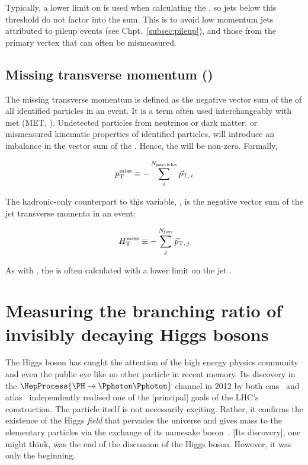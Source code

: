 Typically, a lower limit on \pt is used when calculating the \HT, so jets below this threshold do not factor into the sum. This is to avoid low momentum jets attributed to pileup events (see Chpt.~\ref{subsec:pileup}), and those from the primary vertex that can often be mismeasured.




\subsection{Missing transverse momentum (\texorpdfstring{\ptmiss}{ptmiss})}
\label{subsec:theory_met}

The missing transverse momentum \ptmiss is defined as the negative vector sum of the \pt of all identified particles in an event. It is a term often used interchangeably with \gls{met} (MET, ). Undetected particles from neutrinos or dark matter, or mismeasured kinematic properties of identified particles, will introduce an imbalance in the vector sum of the \pt. Hence, the \ptmiss will be non-zero. Formally,

\begin{equation}
    p_{\mathrm{T}}^\text{miss} \equiv - \sum_i^{N_{\mathrm{particles}}} \vec{p}_{\mathrm{T}, \, i}
    \label{eq:met_definition}
\end{equation}

The hadronic-only counterpart to this variable, \mht, is the negative vector sum of the jet transverse momenta in an event:

\begin{equation}
    H_{\mathrm{T}}^{\text{miss}} \equiv - \sum_j^{N_{\mathrm{jets}}} \vec{p}_{\mathrm{T}, \, j}
    \label{eq:mht_definition}
\end{equation}

As with \HT, the \mht is often calculated with a lower limit on the jet \pt.





\section{Measuring the branching ratio of invisibly decaying Higgs bosons}
\label{sec:theory_higgs_to_inv}

The Higgs boson has caught the attention of the high energy physics community and even the public eye like no other particle in recent memory. Its discovery in the $\HepProcess{\PH \to \Pphoton\Pphoton}$ channel in 2012 by both \acrshort{cms}~\cite{Chatrchyan:2012xdj} and \acrshort{atlas}~\cite{Aad:2012tfa} independently realised one of the [principal] goals of the LHC's construction. The particle itself is not necessarily exciting. Rather, it confirms the existence of the Higgs \emph{field} that pervades the universe and gives mass to the elementary particles via the exchange of its namesake boson~\cite{PhysRevLett.13.321,PhysRevLett.13.508,PhysRevLett.13.585}. [Its discovery], one might think, was the end of the discussion of the Higgs boson. However, it was only the beginning.

